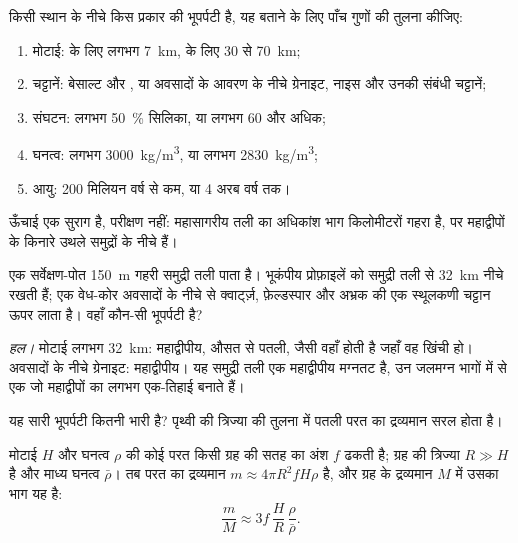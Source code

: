 \begin{method}[महाद्वीपीय और महासागरीय भूपर्पटी की तुलना]\label{met:g12:continental-crust:compare}
किसी स्थान के नीचे किस प्रकार की भूपर्पटी है, यह बताने के लिए पाँच गुणों की तुलना कीजिए:
\begin{enumerate}
  \item मोटाई:  के लिए लगभग \qty{7}{km},  के लिए 30 से
        \qty{70}{km};
  \item चट्टानें: बेसाल्ट और , या अवसादों के आवरण के नीचे ग्रेनाइट, नाइस और उनकी
        संबंधी चट्टानें;
  \item संघटन: लगभग \qty{50}{\percent} सिलिका, या लगभग 60 और
        अधिक;
  \item घनत्व: लगभग \qty{3000}{kg/m^3}, या लगभग \qty{2830}{kg/m^3};
  \item आयु: 200 मिलियन वर्ष से कम, या 4 अरब वर्ष तक।
\end{enumerate}
ऊँचाई एक सुराग है, परीक्षण नहीं: महासागरीय तली का अधिकांश भाग
किलोमीटरों गहरा है, पर महाद्वीपों के किनारे उथले समुद्रों के नीचे हैं।
\end{method}

\begin{example}[एक उथली समुद्री तली]\label{ex:g12:continental-crust:shelf}
एक सर्वेक्षण-पोत \qty{150}{m} गहरी समुद्री तली पाता है। भूकंपीय प्रोफ़ाइलें
 को समुद्री तली से \qty{32}{km} नीचे रखती हैं; एक वेध-कोर
अवसादों के नीचे से क्वार्ट्ज़, फ़ेल्डस्पार और अभ्रक की एक स्थूलकणी चट्टान ऊपर लाता है। वहाँ कौन-सी भूपर्पटी
है?

\emph{हल।} मोटाई लगभग \qty{32}{km}: महाद्वीपीय, औसत से
पतली, जैसी वहाँ होती है जहाँ वह खिंची हो। अवसादों के नीचे ग्रेनाइट:
महाद्वीपीय। यह समुद्री तली एक महाद्वीपीय मग्नतट है, उन जलमग्न
भागों में से एक जो महाद्वीपों का लगभग एक-तिहाई बनाते हैं।
\end{example}

यह सारी भूपर्पटी कितनी भारी है? पृथ्वी की त्रिज्या की तुलना में पतली परत का
द्रव्यमान सरल होता है।

\begin{proposition}\label{prop:g12:continental-crust:thin-layer}
मोटाई $H$ और घनत्व $\rho$ की कोई परत किसी ग्रह की सतह का अंश $f$ ढकती है;
ग्रह की त्रिज्या $R \gg H$ है और माध्य घनत्व $\bar\rho$। तब परत का
द्रव्यमान $m \approx 4\pi R^2 f H \rho$ है, और ग्रह के द्रव्यमान $M$ में उसका भाग यह है:
\[
  \frac{m}{M} \approx 3 f\,\frac{H}{R}\,\frac{\rho}{\bar\rho}.
\]
\end{proposition}

